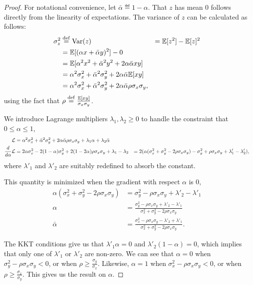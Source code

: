 \begin{proof}
  \newcommand{\alphab}{\bar{\alpha}}
  For notational convenience, let $\alphab \eqdef 1 - \alpha$.
  That $z$ has mean $0$ follows directly from the linearity of expectations.
  The variance of $z$ can be calculated as follows:
  \begin{align*}
    \sigma^2_z &\eqdef \var(z) 
            &= \E[z^2] - \E[z]^2 \\
            &= \E[(\alpha x+ \alphab y)^2] - 0 \\
            &= \E[\alpha^2 x^2 + \alphab^2 y^2 + 2 \alpha \alphab x y] \\
            &= \alpha^2 \sigma_x^2 + \alphab^2 \sigma_y^2 + 2 \alpha \alphab \E[x y] \\
            &= \alpha^2 \sigma_x^2 + \alphab^2 \sigma_y^2 + 2 \alpha \alphab \rho \sigma_x \sigma_y,
  \end{align*}
  using the fact that $\rho \stackrel{\rm def}{=} \frac{\mathbb{E}[xy]}{\sigma_x \sigma_y}$.

  We introduce Lagrange multipliers $\lambda_1, \lambda_2 \ge 0$ to handle the constraint that $0 \le \alpha \le 1$,
  \begin{align*}
    \sL &= 
    \alpha^2 \sigma_x^2 + \alphab^2 \sigma_y^2 + 2 \alpha \alphab \rho \sigma_x \sigma_y
    + \lambda_1 \alpha + \lambda_2 \alphab \\
    \frac{d}{d\alpha} \sL &= 
    2 \alpha \sigma_x^2 - 2(1 - \alpha) \sigma_y^2 + 2 (1 - 2\alpha) \rho \sigma_x \sigma_y + \lambda_1 - \lambda_2
&= 
    2 (\alpha (\sigma_x^2 + \sigma_y^2 - 2 \rho \sigma_x\sigma_y) - \sigma_y^2 + \rho \sigma_x \sigma_y + \lambda'_1 - \lambda'_2),
  \end{align*}
  where $\lambda'_1$ and $\lambda'_2$ are suitably redefined to absorb the constant.

  This quantity is minimized when the gradient with respect $\alpha$ is $0$,
  \begin{align*}
    \alpha (\sigma_x^2 + \sigma_y^2 - 2\rho \sigma_x \sigma_y) &= \sigma_y^2 - \rho \sigma_x \sigma_y + \lambda'_2 - \lambda'_1 \\
    \alpha &= \frac{\sigma_y^2 - \rho \sigma_x \sigma_y + \lambda'_2 - \lambda'_1}{\sigma_x^2 + \sigma_y^2 - 2\rho \sigma_x \sigma_y} \\
    \alphab &= \frac{\sigma_x^2 - \rho \sigma_x \sigma_y - \lambda'_2 + \lambda'_1}{\sigma_x^2 + \sigma_y^2 - 2\rho \sigma_x \sigma_y}.
  \end{align*}

  The KKT conditions give us that $\lambda'_1 \alpha = 0$ and $\lambda'_2 (1-\alpha) = 0$, which implies that only one of $\lambda'_1$ or $\lambda'_2$ are non-zero.
  We can see that $\alpha = 0$ when $\sigma_y^2 - \rho \sigma_x \sigma_y < 0$, or when $\rho \ge \frac{\sigma_y}{\sigma_x}$.
  Likewise, $\alpha = 1$ when $\sigma_x^2 - \rho \sigma_x \sigma_y < 0$, or when $\rho \ge \frac{\sigma_x}{\sigma_y}$.
  This gives us the result on $\alpha$.


\end{proof}
